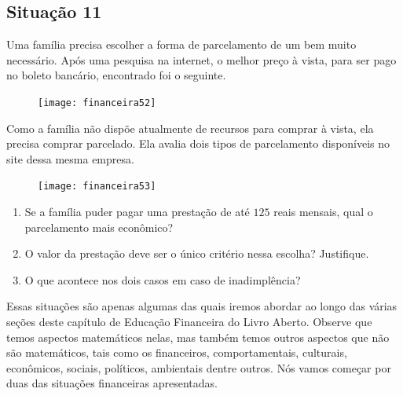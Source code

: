 \subsection{Situação 11}
Uma família precisa escolher a forma de parcelamento de um bem muito necessário. Após uma pesquisa na internet, o melhor preço à vista, para ser pago no boleto bancário, encontrado foi o seguinte.

\begin{figure}[H]
\centering

\texttt{[image: financeira52]}
\end{figure}

Como a família não dispõe atualmente de recursos para comprar à vista, ela precisa comprar parcelado. Ela avalia dois tipos de parcelamento disponíveis no site dessa mesma empresa.

\begin{figure}[H]
\centering

\texttt{[image: financeira53]}
\end{figure}

\begin{enumerate}
\item Se a família puder pagar uma prestação de até $125$ reais mensais, qual o parcelamento mais econômico?
\item O valor da prestação deve ser o único critério nessa escolha? Justifique.
\item  O que acontece nos dois casos em caso de inadimplência?
\end{enumerate}

Essas situações são apenas algumas das quais iremos abordar ao longo das várias seções deste capítulo de Educação Financeira do Livro Aberto. Observe que temos aspectos matemáticos nelas, mas também temos outros aspectos que não são matemáticos, tais como os financeiros, comportamentais, culturais, econômicos, sociais, políticos, ambientais dentre outros. Nós vamos começar por duas das situações financeiras apresentadas. 

